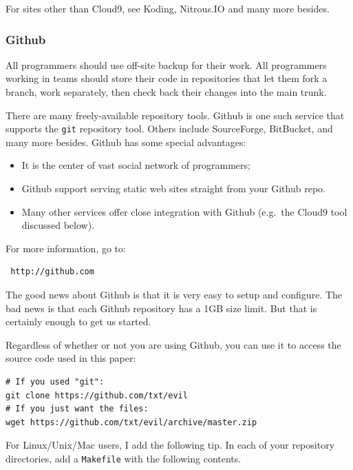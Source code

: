 For sites other than Cloud9, see Koding, Nitrous.IO and many more
besides.

\subsubsection{Github}\label{github}

All programmers should use off-site backup for their work. All
programmers working in teams should store their code in repositories
that let them fork a branch, work separately, then check back their
changes into the main trunk.

There are many freely-available repository tools. Github is one such
service that supports the \texttt{git} repository tool. Others include
SourceForge, BitBucket, and many more besides. Github has some special
advantages:

\begin{itemize}
\itemsep1pt\parskip0pt
\item
  It is the center of vast social network of programmers;
\item
  Github support serving static web sites straight from your Github
  repo.
\item
  Many other services offer close integration with Github (e.g.~the
  Cloud9 tool discussed below).
\end{itemize}

For more information, go to:

\begin{lstlisting}
 http://github.com
\end{lstlisting}

The good news about Github is that it is very easy to setup and
configure. The bad news is that each Github repository has a 1GB size
limit. But that is certainly enough to get us started.

Regardless of whether or not you are using Github, you can use it to
access the source code used in this paper:

\begin{lstlisting}
# If you used "git":
git clone https://github.com/txt/evil
# If you just want the files:
wget https://github.com/txt/evil/archive/master.zip 
\end{lstlisting}

For Linux/Unix/Mac users, I add the following tip. In each of your
repository directories, add a \texttt{Makefile} with the following
contents.

